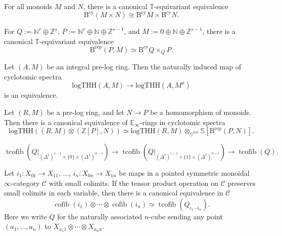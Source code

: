 \documentclass[10pt,a4paper]{amsart}
\newcommand{\Bcy}{\operatorname{B^{cy}}}
\newcommand{\Brep}{\operatorname{B^{rep}}}
\newcommand{\E}{\mathbb{E}}
\newcommand{\N}{\mathbb{N}}
\newcommand{\Sphere}{\mathbb{S}}
\newcommand{\Striv}{\mathbb{S}^{\mathrm{triv}}}
\newcommand{\Z}{\mathbb{Z}}
\newcommand{\cC}{\mathcal{C}}
\newcommand{\cofib}{\operatorname{cofib}}
\newcommand{\logTHH}{\mathrm{logTHH}}
\newcommand{\tcofib}{\operatorname{tcofib}}
\begin{document}
\begin{lem}
\label{Hoch.2}
For all monoids $M$ and $N$, there is a canonical $\mathbb{T}$-equivariant equivalence
\begin{equation}
\label{Hoch.2.1}
\Bcy (M\times N) \cong \Bcy M \times \Bcy N.
\end{equation}
\end{lem}

\begin{lem}
\label{Hoch.14}
For $Q:=\N^r\oplus \Z^s$, $P:=\N^r \oplus \N \oplus \Z^{s-1}$, and $M:=0\oplus \N \oplus \Z^{s-1}$, 
there is a canonical $\mathbb{T}$-equivariant equivalence
\[
\Brep(P,M)
\simeq
\Bcy Q\times_Q P.
\]
\end{lem}

\begin{prop}
\label{Hoch.12}
Let $(A,M)$ be an integral pre-log ring.
Then the naturally induced map of cyclotomic spectra
\begin{equation}
\label{Hoch.12.2}
\logTHH(A,M)
\to
\logTHH(A,M^a)
\end{equation}
is an equivalence.
\end{prop}

\begin{prop}
\label{Hoch.11}
Let $(R,M)$ be a pre-log ring, and let $N\to P$ be a homomorphism of monoids.
Then there is a canonical equivalence of $\E_\infty$-rings in cyclotomic spectra
\begin{equation}
\label{Hoch.11.1}
\logTHH((R,M)\otimes (\Z[P],N))
\simeq
\logTHH(R,M)
\otimes_{\Striv}
\Sphere[\Brep(P,N)].
\end{equation}
\end{prop}

\begin{equation}
\label{Thomdf.5.3}
\tcofib (Q|_{(\Delta^1)^{i-1}\times \{0\}\times (\Delta^1)^{n-i}})
\to
\tcofib (Q|_{(\Delta^1)^{i-1}\times \{1\}\times (\Delta^1)^{n-i}})
\to
\tcofib(Q).
\end{equation}

\begin{prop}
\label{Thomdf.6}
Let $i_1\colon X_{01}\to X_{11}$, $\ldots$, $i_n\colon X_{0n}\to X_{1n}$ be maps in a pointed symmetric monoidal 
$\infty$-category $\cC$ with small colimits.
If the tensor product operation on $\cC$ preserves small colimits in each variable, 
then there is a canonical equivalence in $\cC$
\[
\cofib(i_1)\otimes \cdots \otimes \cofib(i_n)
\simeq
\tcofib(Q_{i_1\cdots i_n}).
\]
Here we write $Q$ for the naturally associated $n$-cube sending any point $(a_1,\ldots,a_n)$ to 
$X_{a_1 1}\otimes \cdots \otimes X_{a_n n}$.
\end{prop}
\end{document}
